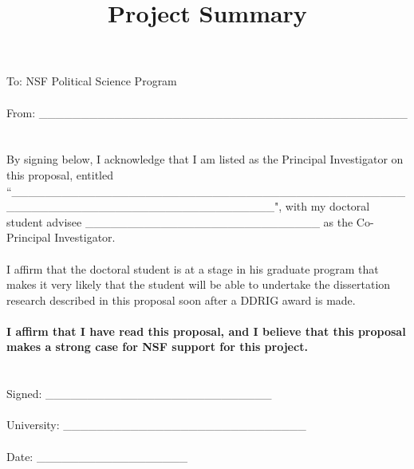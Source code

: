 \documentclass[11pt]{article}
\title{Project Summary}
\date{}
\begin{document}
\vspace{-1.6cm}

\singlespacing

\noindent To: NSF Political Science Program\\
\\
From: \_\_\_\_\_\_\_\_\_\_\_\_\_\_\_\_\_\_\_\_\_\_\_\_\_\_\_\_\_\_\_\_\_\_\_\_\_\_\_\_\_\_\_\_\\
\\
\\
By signing below, I acknowledge that I am listed as the Principal Investigator on this proposal, entitled ``\_\_\_\_\_\_\_\_\_\_\_\_\_\_\_\_\_\_\_\_\_\_\_\_\_\_\_\_\_\_\_\_\_\_\_\_\_\_\_\_\_\_\_\_\_\_\_\_\_\_\_\_\_\_\_\_\_\_\_\_\_\_\_\_\_\_\_\_\_\_\_\_\_\_\_\_\_\_\_", with my doctoral student advisee \_\_\_\_\_\_\_\_\_\_\_\_\_\_\_\_\_\_\_\_\_\_\_\_\_\_\_\_ as the Co-Principal Investigator.\\
\\
I affirm that the doctoral student is at a stage in his graduate program that makes it very likely that the student will be able to undertake the dissertation research described in this proposal soon after a DDRIG award is made.\\
\\
\textbf{I affirm that I have read this proposal, and I believe that this proposal makes a strong case for NSF support for this project.}\\
\\
\\
Signed: \_\_\_\_\_\_\_\_\_\_\_\_\_\_\_\_\_\_\_\_\_\_\_\_\_\_\_\\
\\
University: \_\_\_\_\_\_\_\_\_\_\_\_\_\_\_\_\_\_\_\_\_\_\_\_\_\_\_\_\_\\
\\
Date: \_\_\_\_\_\_\_\_\_\_\_\_\_\_\_\_\_\_

 
\end{document}
